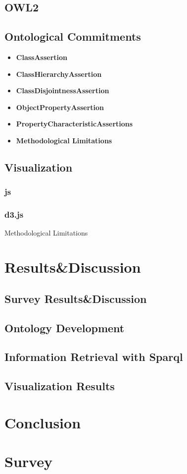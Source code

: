 \documentclass[runningheads]{llncs}
\begin{document}
\subsection{OWL2}

\subsection{Ontological Commitments}

\begin{itemize}
    \item \textbf{ClassAssertion }
    \item \textbf{ClassHierarchyAssertion}
    \item \textbf{ClassDisjointnessAssertion}
    \item \textbf{ObjectPropertyAssertion}
    \item \textbf{PropertyCharacteristicAssertions}
    \item \textbf{Methodological Limitations}
\end{itemize}

\subsection*{Visualization}

\subsubsection{js}

\subsubsection{d3.js}

Methodological Limitations


\section{Results\&Discussion}

\subsection{Survey Results\&Discussion}
\subsection{Ontology Development}
\subsection{Information Retrieval with Sparql}
\subsection{Visualization Results}

\section{Conclusion}





\appendix

\section{Survey}
%
\end{document}
